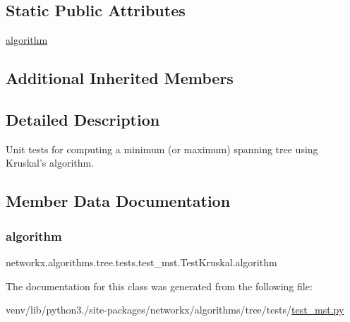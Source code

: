 \subsection*{Static Public Attributes}
\begin{DoxyCompactItemize}
\item 
\hyperlink{classnetworkx_1_1algorithms_1_1tree_1_1tests_1_1test__mst_1_1TestKruskal_a1cdbc4f3d354de18953ac3b89d844488}{algorithm}
\end{DoxyCompactItemize}
\subsection*{Additional Inherited Members}


\subsection{Detailed Description}
\begin{DoxyVerb}Unit tests for computing a minimum (or maximum) spanning tree
using Kruskal's algorithm.\end{DoxyVerb}
 

\subsection{Member Data Documentation}
\mbox{\label{classnetworkx_1_1algorithms_1_1tree_1_1tests_1_1test__mst_1_1TestKruskal_a1cdbc4f3d354de18953ac3b89d844488}} 
\subsubsection{\texorpdfstring{algorithm}{algorithm}}
{\footnotesize\ttfamily networkx.\+algorithms.\+tree.\+tests.\+test\+\_\+mst.\+Test\+Kruskal.\+algorithm\hspace{0.3cm}{\ttfamily [static]}}



The documentation for this class was generated from the following file\+:\begin{DoxyCompactItemize}
\item 
venv/lib/python3./site-\/packages/networkx/algorithms/tree/tests/\hyperlink{test__mst_8py}{test\+\_\+mst.\+py}\end{DoxyCompactItemize}
